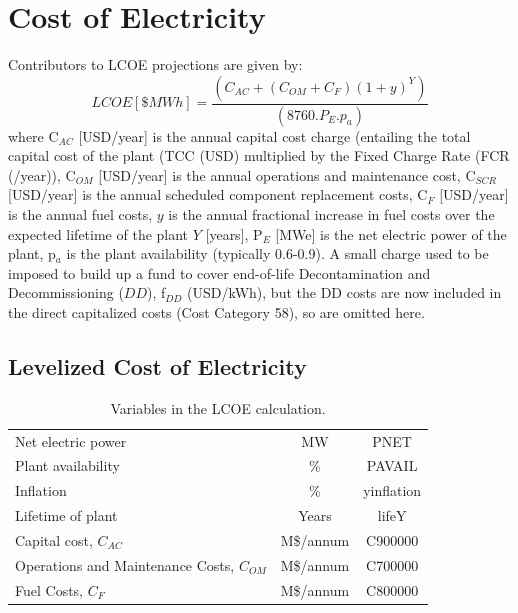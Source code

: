 \newpage 

\section{Cost of Electricity} 

 Contributors to LCOE projections are given by: 
 \begin{equation} 
 LCOE [\$ MWh] = \frac{(C_{AC} + (C_{OM} + C_{F})(1+y)^Y)}{(8760.P_E.p_a)} 
 \label{eq:coe}
\end{equation} 
where C$_{AC}$ [USD/year] is the annual capital cost charge (entailing the total capital cost of the plant (TCC (USD) multiplied by the Fixed Charge Rate (FCR (/year)), C$_{OM}$ [USD/year] is the annual operations and maintenance cost, C$_{SCR}$ [USD/year] is the annual scheduled component replacement costs, C$_{F}$ [USD/year] is the annual fuel costs, $y$ is the annual fractional increase in fuel costs over the expected lifetime of the plant $Y$ [years], P$_{E}$ [MWe] is the net electric power of the plant, p$_{a}$ is the plant availability (typically 0.6-0.9).  A small charge used to be imposed to build up a fund to cover end-of-life Decontamination and Decommissioning ($DD$), f$_{DD}$ (USD/kWh), but the DD costs are now included in the direct capitalized costs (Cost Category 58), so are omitted here.





\subsection{Levelized Cost of Electricity} 

\begin{table}[h!] 
\begin{tabular}{l c c } 
Net electric power & MW & PNET \\
Plant availability & \% & PAVAIL \\
Inflation & \% & yinflation \\
Lifetime of plant & Years & lifeY \\
Capital cost, $C_{AC}$ &     M\$/annum    &    C900000      \\ 
Operations and Maintenance Costs, $C_{OM}$ & M\$/annum  &      C700000 \\ 
Fuel Costs, $C_{F}$ & M\$/annum  &       C800000 \\ 
    \end{tabular} 
    \caption{Variables in the LCOE calculation.}
    \label{tab:lcoe} 
\end{table} 

